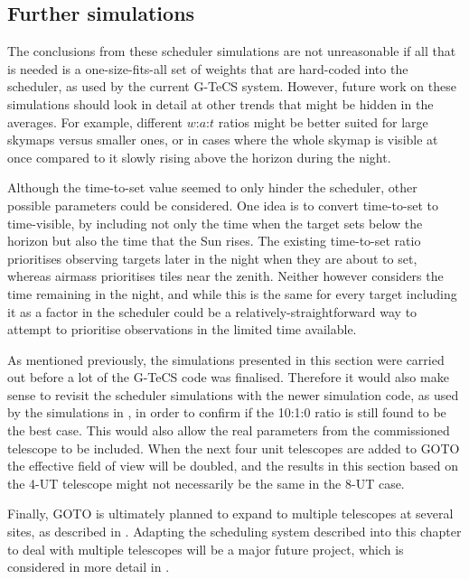 \subsection{Further simulations}
\label{sec:scheduler_sim_future}
\begin{colsection}

The conclusions from these scheduler simulations are not unreasonable if all that is needed is a one-size-fits-all set of weights that are hard-coded into the scheduler, as used by the current G-TeCS system. However, future work on these simulations should look in detail at other trends that might be hidden in the averages. For example, different $w$:$a$:$t$ ratios might be better suited for large skymaps versus smaller ones, or in cases where the whole skymap is visible at once compared to it slowly rising above the horizon during the night.

Although the time-to-set value seemed to only hinder the scheduler, other possible parameters could be considered. One idea is to convert time-to-set to time-visible, by including not only the time when the target sets below the horizon but also the time that the Sun rises. The existing time-to-set ratio prioritises observing targets later in the night when they are about to set, whereas airmass prioritises tiles near the zenith. Neither however considers the time remaining in the night, and while this is the same for every target including it as a factor in the scheduler could be a relatively-straightforward way to attempt to prioritise observations in the limited time available.

As mentioned previously, the simulations presented in this section were carried out before a lot of the G-TeCS code was finalised. Therefore it would also make sense to revisit the scheduler simulations with the newer simulation code, as used by the simulations in , in order to confirm if the 10:1:0 ratio is still found to be the best case. This would also allow the real parameters from the commissioned telescope to be included. When the next four unit telescopes are added to GOTO the effective field of view will be doubled, and the results in this section based on the 4-UT telescope might not necessarily be the same in the 8-UT case.

Finally, GOTO is ultimately planned to expand to multiple telescopes at several sites, as described in . Adapting the scheduling system described into this chapter to deal with multiple telescopes will be a major future project, which is considered in more detail in .

\end{colsection}

